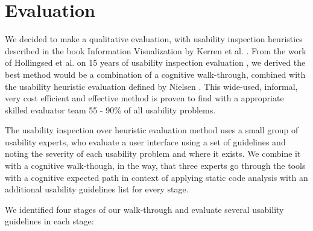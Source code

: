 \documentclass[conference]{IEEEtran}
\begin{document}

%






\section{Evaluation}
\label{sec:evaluation}
We decided to make a qualitative evaluation, with usability inspection heuristics described in the book Information Visualization by Kerren et al. \cite{InformationVisualizationBook}.
From the work of Hollingsed et al. on 15 years of usability inspection evaluation \cite{15yearsUsabilityEvaluation}, we derived the best method would be a combination of a cognitive walk-through, combined with the usability heuristic evaluation defined by Nielsen \cite{Nielsen:UsabilityInspectionMethods}.
This wide-used, informal, very cost efficient and effective method is proven to find with a appropriate skilled evaluator team 55 - 90\% of all usability problems.


The usability inspection over heuristic evaluation method uses a small group of usability experts, who evaluate a
user interface using a set of guidelines and noting the severity of
each usability problem and where it exists. 
We combine it with a cognitive walk-though, in the way, that three experts go through the tools with a cognitive expected path in context of applying static code analysis with an additional usability guidelines list for every stage.


We identified four stages of our walk-through and evaluate several usability guidelines in each stage:
\end{document}
